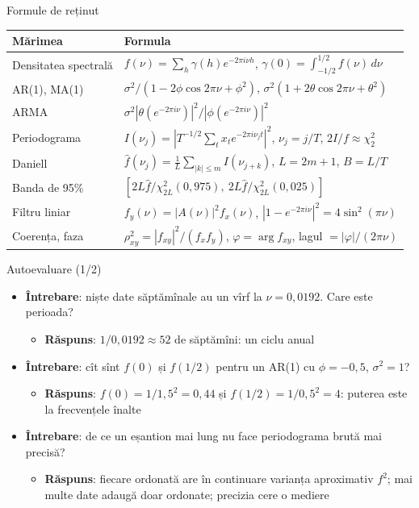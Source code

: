 \begin{frame}{Formule de reținut}
\itemsize{\small}
{\renewcommand{\arraystretch}{1.35}\begin{center}
\footnotesize
\begin{tabular}{ll}
\toprule
\textbf{Mărimea} & \textbf{Formula} \\
\midrule
Densitatea spectrală & $f(\nu) = \sum_h\gamma(h)e^{-2\pi i\nu h}$, \quad $\gamma(0) = \int_{-1/2}^{1/2} f(\nu)\,d\nu$ \\
AR(1), MA(1) & $\sigma^2/(1 - 2\phi\cos 2\pi\nu + \phi^2)$, \quad $\sigma^2(1 + 2\theta\cos 2\pi\nu + \theta^2)$ \\
ARMA & $\sigma^2|\theta(e^{-2\pi i\nu})|^2/|\phi(e^{-2\pi i\nu})|^2$ \\
Periodograma & $I(\nu_j) = |T^{-1/2}\sum_t x_t e^{-2\pi i\nu_j t}|^2$, \quad $\nu_j = j/T$, \quad $2I/f \approx \chi^2_2$ \\
Daniell & $\hat f(\nu_j) = \frac1L\sum_{|k| \le m} I(\nu_{j+k})$, \quad $L = 2m + 1$, \quad $B = L/T$ \\
Banda de 95\% & $[2L\hat f/\chi^2_{2L}(0{,}975),\ 2L\hat f/\chi^2_{2L}(0{,}025)]$ \\
Filtru liniar & $f_y(\nu) = |A(\nu)|^2 f_x(\nu)$, \quad $|1 - e^{-2\pi i\nu}|^2 = 4\sin^2(\pi\nu)$ \\
Coerența, faza & $\rho^2_{xy} = |f_{xy}|^2/(f_x f_y)$, \quad $\varphi = \arg f_{xy}$, \quad lagul $= |\varphi|/(2\pi\nu)$ \\
\bottomrule
\end{tabular}
\end{center}
}
\end{frame}

\begin{frame}{Autoevaluare (1/2)}
\itemsize{\footnotesize}
\begin{itemize}
    \item \textbf{Întrebare}: niște date săptămînale au un vîrf la $\nu = 0{,}0192$. Care este perioada?
    \begin{itemize}
        \item \textbf{Răspuns}: $1/0{,}0192 \approx 52$ de săptămîni: un ciclu anual
    \end{itemize}
    \item \textbf{Întrebare}: cît sînt $f(0)$ și $f(1/2)$ pentru un AR(1) cu $\phi = -0{,}5$, $\sigma^2 = 1$?
    \begin{itemize}
        \item \textbf{Răspuns}: $f(0) = 1/1{,}5^2 = 0{,}44$ și $f(1/2) = 1/0{,}5^2 = 4$: puterea este la frecvențele înalte
    \end{itemize}
    \item \textbf{Întrebare}: de ce un eșantion mai lung nu face periodograma brută mai precisă?
    \begin{itemize}
        \item \textbf{Răspuns}: fiecare ordonată are în continuare varianța aproximativ $f^2$; mai multe date adaugă doar ordonate; precizia cere o mediere
    \end{itemize}
\end{itemize}
\end{frame}

